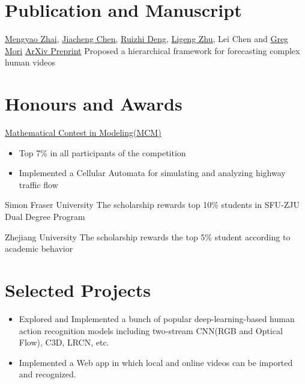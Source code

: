 \documentclass[11pt,a4paper,sans]{moderncv}   %
\begin{document}
\section{Publication and Manuscript}
{}
{\newline \href{https://mzhai.weebly.com/}{Mengyao Zhai}, \underline{\href{http://jcchen.me/}{Jiacheng Chen}}, \href{http://www.sfu.ca/~ruizhid/}{Ruizhi Deng}, \href{https://lzhu.me/}{Ligeng Zhu}, Lei Chen and \href{http://www.cs.sfu.ca/~mori/}{Greg Mori}}
{\newline \href{https://arxiv.org/abs/1712.01955}{ArXiv Preprint}}
{Proposed a hierarchical framework for forecasting complex human videos}

\section{Honours and Awards}
{\href{https://www.comap.com/undergraduate/contests/mcm/}{Mathematical Contest in Modeling(MCM)}}
{}
{}
{
\begin{itemize}
\item Top 7\% in all participants of the competition
\item Implemented a Cellular Automata for simulating and analyzing highway traffic flow
\end{itemize}}

{Simon Fraser University}
{}
{}
{The scholarship rewards top 10\% students in SFU-ZJU Dual Degree Program}

{Zhejiang University}
{}
{}
{The scholarship rewards the top 5\% student according to academic behavior}

\section{Selected Projects}

{%
\begin{itemize}%
\item Explored and Implemented a bunch of popular deep-learning-based human action recognition models including two-stream CNN(RGB and Optical Flow), C3D, LRCN, etc.
%
\item Implemented a Web app in which local and online videos can be imported and recognized.
\end{itemize}
}
\end{document}
